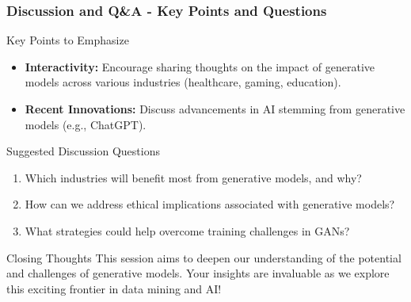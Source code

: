 \documentclass[aspectratio=169]{beamer}
\begin{document}
\begin{frame}[fragile]
    \frametitle{Discussion and Q\&A - Key Points and Questions}
    
    \begin{block}{Key Points to Emphasize}
        \begin{itemize}
            \item \textbf{Interactivity:} Encourage sharing thoughts on the impact of generative models across various industries (healthcare, gaming, education).
            \item \textbf{Recent Innovations:} Discuss advancements in AI stemming from generative models (e.g., ChatGPT).
        \end{itemize}
    \end{block}
    
    \begin{block}{Suggested Discussion Questions}
        \begin{enumerate}
            \item Which industries will benefit most from generative models, and why?
            \item How can we address ethical implications associated with generative models?
            \item What strategies could help overcome training challenges in GANs?
        \end{enumerate}
    \end{block}
    
    \begin{block}{Closing Thoughts}
        This session aims to deepen our understanding of the potential and challenges of generative models. Your insights are invaluable as we explore this exciting frontier in data mining and AI!
    \end{block}
\end{frame}
\end{document}
